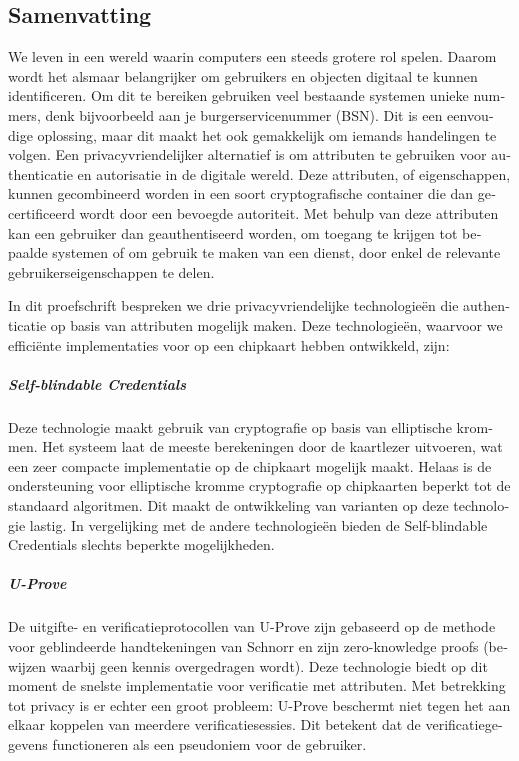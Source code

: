 \begin{otherlanguage}{dutch}

\chapter*{Samenvatting}

We leven in een wereld waarin computers een steeds grotere rol spelen. Daarom 
wordt het alsmaar belangrijker om gebruikers en objecten digitaal te kunnen
identificeren. Om dit te bereiken gebruiken veel bestaande systemen unieke 
nummers, denk bijvoorbeeld aan je burgerservicenummer (BSN). Dit is een 
eenvoudige oplossing, maar dit maakt het ook gemakkelijk om iemands handelingen
te volgen. Een privacyvriendelijker alternatief is om attributen te gebruiken 
voor authenticatie en autorisatie in de digitale wereld. Deze attributen, of 
eigenschappen, kunnen gecombineerd worden in een soort cryptografische container
die dan gecertificeerd wordt door een bevoegde autoriteit. Met behulp van deze 
attributen kan een gebruiker dan geauthentiseerd worden, om toegang te krijgen 
tot bepaalde systemen of om gebruik te maken van een dienst, door enkel de 
relevante gebruikerseigenschappen te delen.

In dit proefschrift bespreken we drie privacyvriendelijke technologie\"{e}n die
authenticatie op basis van attributen mogelijk maken. Deze technologie\"{e}n, 
waarvoor we effici\"{e}nte implementaties voor op een chipkaart hebben 
ontwikkeld, zijn:

\paragraph{Self-blindable Credentials}
Deze technologie maakt gebruik van cryptografie op basis van elliptische
krommen. Het systeem laat de meeste berekeningen door de kaartlezer uitvoeren, 
wat een zeer compacte implementatie op de chipkaart mogelijk maakt. Helaas is 
de ondersteuning voor elliptische kromme cryptografie op chipkaarten beperkt 
tot de standaard algoritmen. Dit maakt de ontwikkeling van varianten op 
deze technologie lastig. In vergelijking met de andere technologie\"{e}n bieden
de Self-blindable Credentials slechts beperkte mogelijkheden.

\paragraph{U-Prove}
De uitgifte- en verificatieprotocollen van U-Prove zijn gebaseerd op de methode
voor geblindeerde handtekeningen van Schnorr en zijn zero-knowledge proofs 
(bewijzen waarbij geen kennis overgedragen wordt). Deze technologie biedt op dit
moment de snelste implementatie voor verificatie met attributen. Met
betrekking tot privacy is er echter een groot probleem: U-Prove beschermt niet 
tegen het aan elkaar koppelen van meerdere verificatiesessies. Dit betekent dat de verificatiegegevens functioneren als een pseudoniem voor de gebruiker.


\end{otherlanguage}
